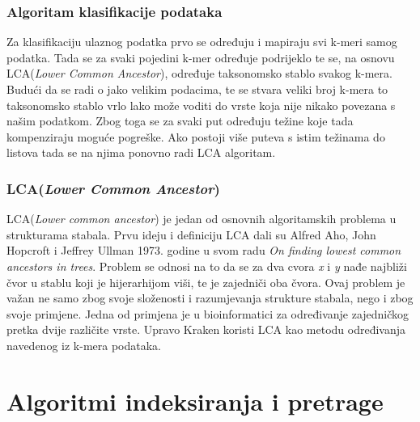 \documentclass[times, utf8, zavrsni]{fer}
\begin{document}
{%

\subsection{Algoritam klasifikacije podataka}
Za klasifikaciju ulaznog podatka prvo se određuju i mapiraju svi k-meri samog podatka. Tada se za svaki pojedini k-mer određuje podrijeklo te se, na osnovu LCA(\textit{Lower Common Ancestor}), određuje taksonomsko stablo svakog k-mera. Budući da se radi o jako velikim podacima, te se stvara veliki broj k-mera to taksonomsko stablo vrlo lako može voditi do vrste koja nije nikako povezana s našim podatkom. Zbog toga se za svaki put određuju težine koje tada kompenziraju moguće pogreške. Ako postoji više puteva s istim težinama do listova tada se na njima ponovno radi LCA algoritam.
\subsection{LCA(\textit{Lower Common Ancestor})}
LCA(\textit{Lower common ancestor}) je jedan od osnovnih algoritamskih problema u strukturama stabala. Prvu ideju i definiciju LCA dali su Alfred Aho, John Hopcroft i Jeffrey Ullman 1973. godine u svom radu \textit{On finding lowest common ancestors in trees}. Problem se odnosi na to da se za dva cvora \textit{x} i \textit{y} nađe najbliži čvor u stablu koji je hijerarhijom viši, te je zajedniči oba čvora. Ovaj problem je važan ne samo zbog svoje složenosti i razumjevanja strukture stabala, nego i zbog svoje primjene. Jedna od primjena je u bioinformatici za određivanje zajedničkog pretka dvije različite vrste. Upravo Kraken koristi LCA kao metodu određivanja navedenog iz k-mera podataka.
\chapter{Algoritmi indeksiranja i pretrage}
}
\end{document}
